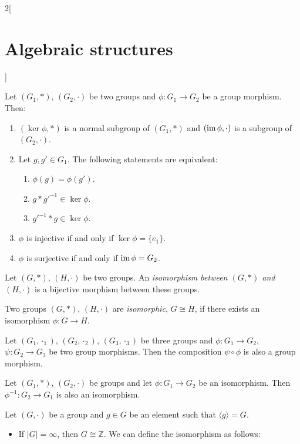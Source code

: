 \documentclass[../../../main.tex]{subfiles}
\begin{document}
\begin{multicols}{2}[\section{Algebraic structures}]
\begin{definition}
\end{definition}
\begin{prop}
    Let $(G_1,*)$, $(G_2,\cdot)$ be two groups and $\phi:G_1\rightarrow G_2$ be a group morphism. Then:
    \begin{enumerate}
        \item $(\ker\phi,*)$ is a normal subgroup of $(G_1,*)$ and $(\operatorname{im}\phi,\cdot)$ is a subgroup of $(G_2,\cdot)$.
        \item Let $g,g'\in G_1$. The following statements are equivalent:
        \begin{enumerate}
            \item $\phi(g)=\phi(g')$.
            \item $g*g'^{-1}\in\ker\phi$.
            \item $g'^{-1}*g\in\ker\phi$.
        \end{enumerate}
        \item $\phi$ is injective if and only if $\ker\phi=\{e_1\}$.
        \item $\phi$ is surjective if and only if $\operatorname{im}\phi=G_2$.
    \end{enumerate}
\end{prop}
\begin{definition}
    Let $(G,*)$, $(H,\cdot)$ be two groups. An \textit{isomorphism between $(G,*)$ and $(H,\cdot)$} is a bijective morphism between these groups.
\end{definition}
\begin{definition}
    Two groups $(G,*)$, $(H,\cdot)$ are \textit{isomorphic}, $G\cong H$, if there exists an isomorphism $\phi:G\rightarrow H$.
\end{definition}
\begin{prop}
    Let $(G_1,\cdot_1)$, $(G_2,\cdot_2)$, $(G_3,\cdot_3)$ be three groups and $\phi:G_1\rightarrow G_2$, $\psi:G_2\rightarrow G_3$ be two group morphisms. Then the composition $\psi\circ\phi$ is also a group morphism.
\end{prop}
\begin{prop}
    Let $(G_1,*)$, $(G_2,\cdot)$ be groups and let $\phi: G_1\rightarrow G_2$ be an isomorphism. Then $\phi^{-1}: G_2\rightarrow G_1$ is also an isomorphism.
\end{prop}
\begin{theorem}
    Let $(G,\cdot)$ be a group and $g\in G$ be an element such that $\langle g\rangle=G$.
    \begin{itemize}
        \item If $|G|=\infty$, then $G\cong\mathbb{Z}$. We can define the isomorphism as follows: 

\end{itemize}
\end{theorem}
\end{multicols}
\end{document}
